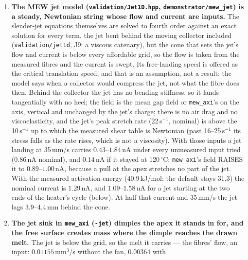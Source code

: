 \documentclass[11pt,a4paper]{article}
\newcommand{\code}[1]{\texttt{\small #1}}
\begin{document}
\begin{enumerate}[leftmargin=1.4em,itemsep=4pt]
  $15.10$\,s, a printhead disc $18.19$\,s, the default box $15.80$\,s), and the
  nominal surface tension at $\pm20\,\%$ moves the stalled drop by less than
  a cell; the measured activation energy, $40.9$ in place of the literature's
  $31.3$\,kJ/mol, by one cell and $4\,\%$ at 60\,s. So the model's
  prediction is a regime, not a time, and the measurement that decides it is
  the temperature of the air and of the melt at the tip.
\item \textbf{The MEW jet model (\code{validation/Jet1D.hpp},
  \code{demonstrator/mew\_jet}) is a steady, Newtonian string whose flow and
  current are inputs.} The slender-jet equations themselves are solved to fourth
  order against an exact solution for every term, the jet bent behind the moving
  collector included (\code{validation/jet1d}, J9: a viscous catenary), but the
  cone that sets the jet's flow and current is below every affordable grid, so
  the flow is taken from the measured fibres and the current is swept. Its
  free-landing speed is offered as the critical translation speed, and that is
  an assumption, not a result: the model says when a collector would compress
  the jet, not what the fibre does then. Behind the collector the jet has no
  bending stiffness, so it lands tangentially with no heel; the field is the
  mean gap field or \code{mew\_axi}'s on the axis, vertical and unchanged by the
  jet's charge; there is no air drag and no viscoelasticity, and the jet's peak
  stretch rate (22\,s$^{-1}$, nominal) is above the 10\,s$^{-1}$ up to which
  the measured shear table is Newtonian (past 16--25\,s$^{-1}$ its stress falls
  as the rate rises, which is not a viscosity). With those inputs a jet landing at 35\,mm/s
  carries $0.43$--$1.84$\,nA under every unmeasured input tried ($0.86$\,nA
  nominal), and $0.14$\,nA if it stayed at 120\,$^\circ$C; \code{mew\_axi}'s field
  RAISES it to $0.89$--$1.00$\,nA, because a pull at the apex stretches no part of
  the jet. With the measured activation energy ($40.9$\,kJ/mol; the default
  stays $31.3$) the nominal current is $1.29$\,nA, and $1.09$--$1.58$\,nA for a
  jet starting at the two ends of the heater's cycle (below). At half that current and 35\,mm/s the jet lags $3.9$--$4.4$\,mm
  behind the cone.
\item \textbf{The jet sink in \code{mew\_axi} (\code{-jet}) dimples the apex
  it stands in for, and the free surface creates mass where the dimple reaches
  the drawn melt.} The jet is below the grid, so the melt it carries --- the
  fibres' flow, an input: $0.01155$\,mm$^3$/s without the fan, $0.00364$ with

\end{enumerate}
\end{document}
